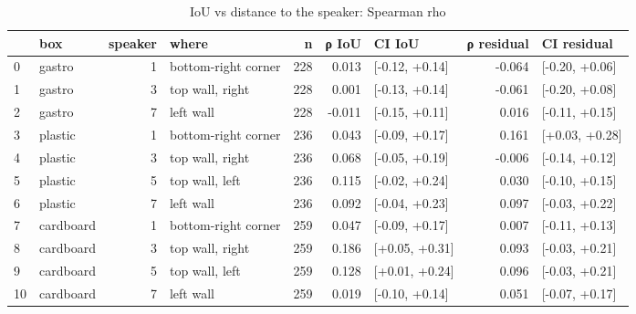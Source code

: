 \begin{table}
\caption{IoU vs distance to the speaker: Spearman rho}
\label{tab:speaker_distance}
\begin{tabular}{llrlrrlrl}
\toprule
 & box & speaker & where & n & ρ IoU & CI IoU & ρ residual & CI residual \\
\midrule
0 & gastro & 1 & bottom-right corner & 228 & 0.013 & [-0.12, +0.14] & -0.064 & [-0.20, +0.06] \\
1 & gastro & 3 & top wall, right & 228 & 0.001 & [-0.13, +0.14] & -0.061 & [-0.20, +0.08] \\
2 & gastro & 7 & left wall & 228 & -0.011 & [-0.15, +0.11] & 0.016 & [-0.11, +0.15] \\
3 & plastic & 1 & bottom-right corner & 236 & 0.043 & [-0.09, +0.17] & 0.161 & [+0.03, +0.28] \\
4 & plastic & 3 & top wall, right & 236 & 0.068 & [-0.05, +0.19] & -0.006 & [-0.14, +0.12] \\
5 & plastic & 5 & top wall, left & 236 & 0.115 & [-0.02, +0.24] & 0.030 & [-0.10, +0.15] \\
6 & plastic & 7 & left wall & 236 & 0.092 & [-0.04, +0.23] & 0.097 & [-0.03, +0.22] \\
7 & cardboard & 1 & bottom-right corner & 259 & 0.047 & [-0.09, +0.17] & 0.007 & [-0.11, +0.13] \\
8 & cardboard & 3 & top wall, right & 259 & 0.186 & [+0.05, +0.31] & 0.093 & [-0.03, +0.21] \\
9 & cardboard & 5 & top wall, left & 259 & 0.128 & [+0.01, +0.24] & 0.096 & [-0.03, +0.21] \\
10 & cardboard & 7 & left wall & 259 & 0.019 & [-0.10, +0.14] & 0.051 & [-0.07, +0.17] \\
\bottomrule
\end{tabular}
\end{table}
